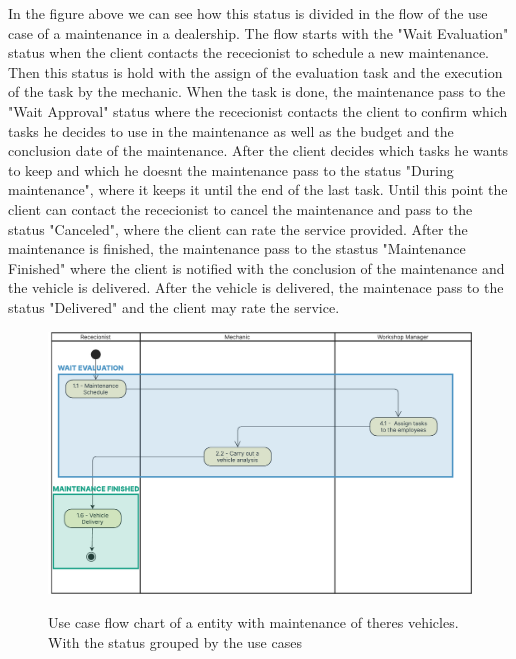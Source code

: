 In the figure above we can see how this status is divided in the flow of the use case of a maintenance in a dealership.
The flow starts with the "Wait Evaluation" status when the client contacts the rececionist to schedule a new maintenance. Then this status is hold with the assign of the evaluation task and the execution of the task by the mechanic.
When the task is done, the maintenance pass to the "Wait Approval" status where the rececionist contacts the client to confirm which tasks he decides to use in the maintenance as well as the budget and the conclusion date of the maintenance.
After the client decides which tasks he wants to keep and which he doesnt the maintenance pass to the status "During maintenance", where it keeps it until the end of the last task. Until this point the client can contact the rececionist to cancel the maintenance and pass to the status "Canceled", where the client can rate the service provided.
After the maintenance is finished, the maintenance pass to the stastus "Maintenance Finished" where the client is notified with the conclusion of the maintenance and the vehicle is delivered. After the vehicle is delivered, the maintenace pass to the status "Delivered" and the client may rate the service.

\begin{figure}[h]
  \caption{Use case flow chart of a entity with maintenance of theres vehicles. With the status grouped by the use cases}
  \centering
  \includegraphics[width=\textwidth]{figs/Status/Maintenance/EntityDiagram}
  \label{fig:figure2}
\end{figure}

